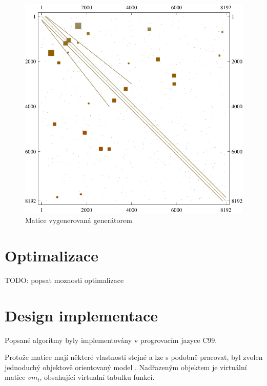 \begin{figure}[H]
	\includegraphics[width=1.0\textwidth]{./images/generated_matrix}
	\caption{Matice vygenerovaná generátorem}
	\label{fig:aftOrsirr1}
\end{figure}

\section{Optimalizace}

TODO: popsat moznosti optimalizace

\section{Design implementace}

Popsané algoritmy byly implementovány v progrovacím jazyce C99.

Protože matice mají některé vlastnosti stejné a lze s podobně pracovat, byl zvolen jednoduchý objektově orientovaný model \cite{schreiner1994objektorientierte}. Nadřazeným objektem je virtuální matice $vm_t$, obsahující virtualní tabulku funkcí.
	
